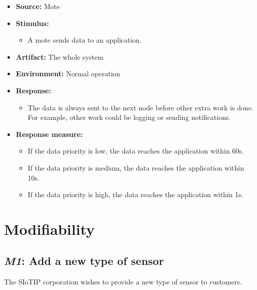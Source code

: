 \begin{itemize}
    \item \textbf{Source:} Mote
    \item \textbf{Stimulus:}
        \begin{itemize}
            \item A mote sends data to an application.
        \end{itemize}

    \item \textbf{Artifact:} The whole system
    \item \textbf{Environment:} Normal operation
    \item \textbf{Response:}
        \begin{itemize}
            \item The data is always sent to the next node before other extra
                  work is done. For example, other work could be logging
                  or sending notifications.
        \end{itemize}

    \item \textbf{Response measure:}
        \begin{itemize}
            \item If the data priority is low, the data reaches the application
                  within 60s.
            \item If the data priority is medium, the data reaches the application
                  within 10s.
            \item If the data priority is high, the data reaches the application
                  within 1s.
        \end{itemize}
\end{itemize}

\section{Modifiability}
\subsection{\emph{M1}: Add a new type of sensor}
The SIoTIP corporation wishes to provide a new type of sensor to customers.

